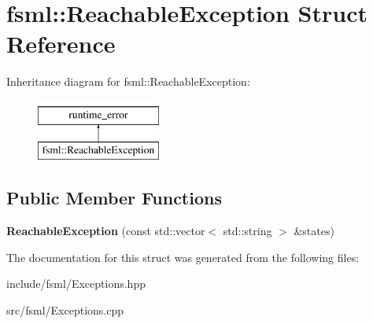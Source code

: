 \hypertarget{structfsml_1_1ReachableException}{\section{fsml\-:\-:Reachable\-Exception Struct Reference}
\label{structfsml_1_1ReachableException}
}
Inheritance diagram for fsml\-:\-:Reachable\-Exception\-:\begin{figure}[H]
\begin{center}
\leavevmode
\includegraphics[height=2.000000cm]{structfsml_1_1ReachableException}
\end{center}
\end{figure}
\subsection*{Public Member Functions}
\begin{DoxyCompactItemize}
\item 
\hypertarget{structfsml_1_1ReachableException_ae4196974211a8b011225493b86ed196e}{{\bfseries Reachable\-Exception} (const std\-::vector$<$ std\-::string $>$ \&states)}\label{structfsml_1_1ReachableException_ae4196974211a8b011225493b86ed196e}

\end{DoxyCompactItemize}


The documentation for this struct was generated from the following files\-:\begin{DoxyCompactItemize}
\item 
include/fsml/Exceptions.\-hpp\item 
src/fsml/Exceptions.\-cpp\end{DoxyCompactItemize}
